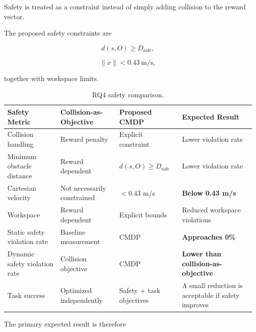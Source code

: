 \documentclass[journal]{IEEEtran}
\begin{document}
Safety is treated as a constraint instead of simply adding collision
to the reward vector.

The proposed safety constraints are

\begin{equation}
d(s,O)\geq D_{\mathrm{safe}},
\end{equation}

\begin{equation}
\|\dot{x}\| < 0.43~\mathrm{m/s},
\end{equation}

together with workspace limits.

\begin{table}[t]
\centering
\caption{RQ4 safety comparison.}
\label{tab:rq4}
\renewcommand{\arraystretch}{1.2}
\setlength{\tabcolsep}{4pt}

\begin{tabular}{l l l l}
\toprule
\textbf{Safety Metric}
&
\textbf{Collision-as-Objective}
&
\textbf{Proposed CMDP}
&
\textbf{Expected Result}
\\
\midrule

Collision handling
&
Reward penalty
&
Explicit constraint
&
Lower violation rate
\\

Minimum obstacle distance
&
Reward dependent
&
$d(s,O)\geq D_{\mathrm{safe}}$
&
Lower violation rate
\\

Cartesian velocity
&
Not necessarily constrained
&
$<0.43$ m/s
&
\textbf{Below 0.43 m/s}
\\

Workspace
&
Reward dependent
&
Explicit bounds
&
Reduced workspace violations
\\

Static safety violation rate
&
Baseline measurement
&
CMDP
&
\textbf{Approaches 0\%}
\\

Dynamic safety violation rate
&
Collision objective
&
CMDP
&
\textbf{Lower than collision-as-objective}
\\

Task success
&
Optimized independently
&
Safety + task objectives
&
A small reduction is acceptable if safety improves
\\

\bottomrule
\end{tabular}
\end{table}

The primary expected result is therefore
\end{document}
